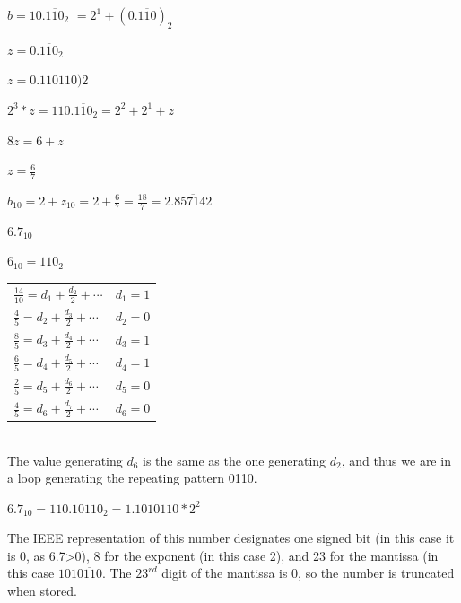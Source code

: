 \eenum

\item

	$b = 10.\overline{110}_2$
	$= 2^1 + (0.\overline{110})_2$

	$z = 0.\overline{110}_2$

	$z = 0.110\overline{110})2$

	$2^3*z = 110.\overline{110}_2 = 2^2 + 2^1 + z$

	$8z = 6+z$

	$z = \frac{6}{7}$

	$b_{10} = 2 + z_{10} = 2 + \frac{6}{7} = \frac{18}{7} = 2.\overline{857142}$

\item


	$6.7_{10}$

	$6_{10} = 110_2$

	\begin{tabular}{ll}

		$\frac{14}{10} = d_1 + \frac{d_2}{2} + \cdots$ & $ d_1 = 1$ \\

		$\frac{4}{5} = d_2 + \frac{d_3}{2} + \cdots$ & $d_2 = 0$ \\

		$\frac{8}{5} = d_3 + \frac{d_4}{2} + \cdots$ & $d_3 = 1$ \\

		$\frac{6}{5} = d_4 + \frac{d_5}{2} + \cdots$ & $d_4 = 1$ \\

		$\frac{2}{5} = d_5 + \frac{d_6}{2} + \cdots$ & $d_5 = 0$ \\

		$\frac{4}{5} = d_6 + \frac{d_7}{2} + \cdots$ & $d_6 = 0$ \\

	\end{tabular} \\

	The value generating $d_6$ is the same as the one generating $d_2$, and thus we are in a loop generating
	the repeating pattern 0110.

	$6.7_{10} = 110.1\overline{0110}_2 = 1.101\overline{0110}*2^2$

	The IEEE representation of this number designates one signed bit (in this case it is 0, as 6.7>0), 8 for the exponent (in this case 2),
	and 23 for the mantissa (in this case $101\overline{0110}$. The $23^{rd}$ digit of the mantissa is 0, so the number is truncated when
	stored.

